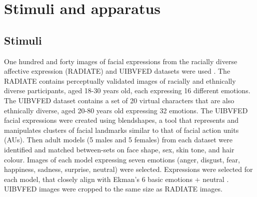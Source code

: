 \section{Stimuli and apparatus}
\subsection{Stimuli}
One hundred and forty images of facial expressions from the racially diverse affective expression (RADIATE) and UIBVFED datasets were used \citep{conley_racially_2018, oliver_uibvfed_2020}.
The RADIATE contains perceptually validated images of racially and ethnically diverse participants, aged 18-30 years old, each expressing 16 different emotions. 
The UIBVFED dataset contains a set of 20 virtual characters that are also ethnically diverse, aged 20-80 years old expressing 32 emotions. 
The UIBVFED facial expressions were created using blendshapes, a tool that represents and manipulates clusters of facial landmarks similar to that of facial action units (AUs).
Then adult models (5 males and 5 females) from each dataset were identified and matched between-sets on face shape, sex, skin tone, and hair colour. 
Images of each model expressing seven emotions (anger, disgust, fear, happiness, sadness, surprise, neutral) were selected. 
Expressions were selected for each model, that closely align with Ekman's 6 basic emotions + neutral \citep{ekman1971constants}.
UIBVFED images were cropped to the same size as RADIATE images. 

